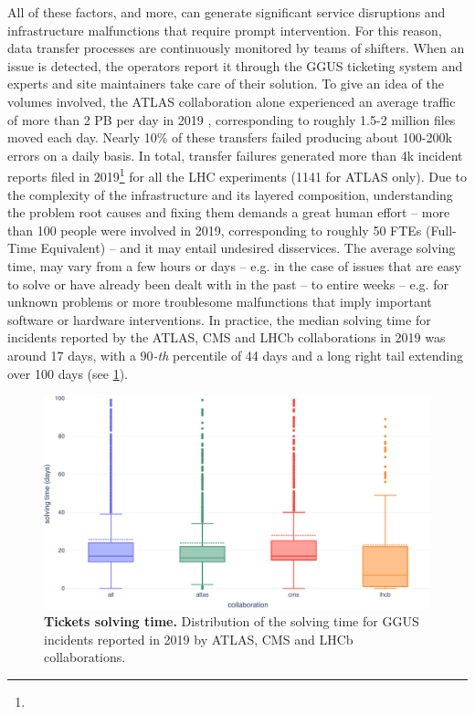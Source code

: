 All of these factors, and more, can generate significant service disruptions and infrastructure malfunctions that require prompt intervention.
For this reason, data transfer processes are continuously monitored by teams of shifters. When an issue is detected, the operators report it through the GGUS ticketing system \cite{antoni2008ggus} and experts and site maintainers take care of their solution.
To give an idea of the volumes involved, the ATLAS collaboration alone experienced an average traffic of more than 2 PB per day in 2019 \cite{calafiura2020design_report}, corresponding to roughly 1.5-2 million files moved each day.
Nearly 10\% of these transfers failed producing about 100-200k errors on a daily basis. 
In total, transfer failures generated more than 4k incident reports filed in 2019\footnote{\ggus} for all the LHC experiments (1141 for ATLAS only).
Due to the complexity of the infrastructure and its layered composition, understanding the problem root causes and fixing them demands a great human effort -- more than 100 people were involved in 2019, corresponding to roughly 50 FTEs (Full-Time Equivalent) -- and it may entail undesired disservices.
The average solving time, may vary from a few hours or days -- e.g. in the case of issues that are easy to solve or have already been dealt with in the past -- to entire weeks -- e.g. for unknown problems or more troublesome malfunctions that imply important software or hardware interventions.
In practice, the median solving time for incidents reported by the ATLAS, CMS and LHCb collaborations in 2019 was around 17 days, with a 90\textit{-th} percentile of 44 days and a long right tail extending over 100 days (see \cref{fig:ggus_time}).
\begin{figure}
    \centering
    \includegraphics[width=\textwidth]{figures/220_introduction/GGUS_time.pdf}
    \caption{\textbf{Tickets solving time.} Distribution of the solving time for GGUS incidents reported in 2019 by ATLAS, CMS and LHCb collaborations.}
    \label{fig:ggus_time}
\end{figure}
